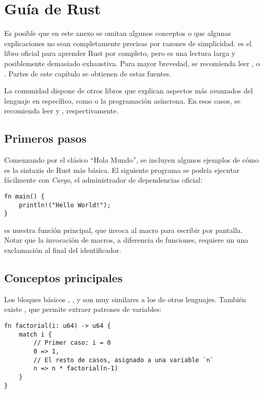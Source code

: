 \chapter{Guía de Rust}\label{annex:rust}

Es posible que en este anexo se omitan algunos conceptos o que algunas
explicaciones no sean completamente precisas por razones de simplicidad.
 es el libro oficial para aprender Rust por completo, pero es
una lectura larga y posiblemente demasiado exhaustiva. Para mayor brevedad, se
recomienda leer ,  o
. Partes de este capítulo se obtienen de estas fuentes.

La comunidad dispone de otros libros que explican aspectos más avanzados del
lenguaje en específico, como \unsafe o la programación asíncrona. En esos casos,
se recomienda leer  y ,
respectivamente.

\section{Primeros pasos}

Comenzando por el clásico ``Hola Mundo'', se incluyen algunos ejemplos de cómo
es la sintaxis de Rust más básica. El siguiente programa se podría ejecutar
fácilmente con \emph{Cargo}, el administrador de dependencias oficial:

\begin{verbatim}
fn main() {
    println!("Hello World!");
}
\end{verbatim}

 es nuestra función principal, que invoca al macro 
para escribir por pantalla. Notar que la invocación de macros, a diferencia de
funciones, requiere un una exclamación al final del identificador.

\section{Conceptos principales}

Los bloques básicos , ,  y  son muy
similares a los de otros lenguajes. También existe , que permite
extraer patrones de variables:

\begin{verbatim}
fn factorial(i: u64) -> u64 {
    match i {
        // Primer caso: i = 0
        0 => 1,
        // El resto de casos, asignado a una variable `n`
        n => n * factorial(n-1)
    }
}
\end{verbatim}

